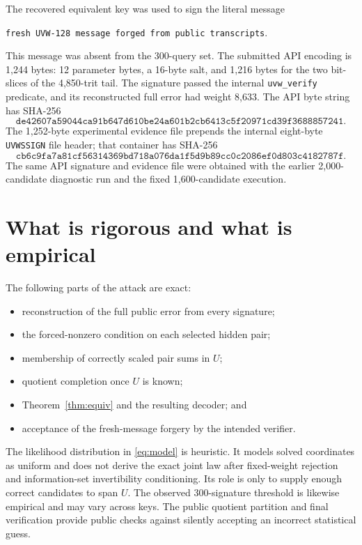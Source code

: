 \documentclass[11pt,a4paper]{article}
\begin{document}
The recovered equivalent key was used to sign the literal message
\begin{center}
\texttt{fresh UVW-128 message forged from public transcripts}.
\end{center}
This message was absent from the 300-query set.  The submitted API encoding is
1,244 bytes: 12 parameter bytes, a 16-byte salt, and 1,216 bytes for the two
bit-slices of the 4,850-trit tail.  The signature passed the internal \texttt{uvw\_verify} predicate,
and its reconstructed full error had weight 8,633.  The API byte string has SHA-256
\[
\texttt{de42607a59044ca91b647d610be24a601b2cb6413c5f20971cd39f3688857241}.
\]
The 1,252-byte experimental evidence file prepends the internal eight-byte
\texttt{UVWSSIGN} file header; that container has SHA-256
\[
\texttt{cb6c9fa7a81cf56314369bd718a076da1f5d9b89cc0c2086ef0d803c4182787f}.
\]
The same API signature and evidence file were obtained with the earlier
2,000-candidate diagnostic run and the fixed 1,600-candidate execution.

\section{What is rigorous and what is empirical}

The following parts of the attack are exact:
\begin{itemize}[leftmargin=1.5em]
  \item reconstruction of the full public error from every signature;
  \item the forced-nonzero condition on each selected hidden pair;
  \item membership of correctly scaled pair sums in $U$;
  \item quotient completion once $U$ is known;
  \item Theorem~\ref{thm:equiv} and the resulting decoder; and
  \item acceptance of the fresh-message forgery by the intended verifier.
\end{itemize}

The likelihood distribution in \eqref{eq:model} is heuristic.  It models
solved coordinates as uniform and does not derive the exact joint law after
fixed-weight rejection and information-set invertibility conditioning.  Its
role is only to supply enough correct candidates to span $U$.  The observed
300-signature threshold is likewise empirical and may vary across keys.  The
public quotient partition and final verification provide public checks against
silently accepting an incorrect statistical guess.
\end{document}
